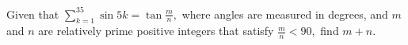 Given that $\sum_{k=1}^{35}\sin 5k=\tan \frac mn,$ where angles are measured in degrees, and $m$ and $n$ are relatively prime positive integers that satisfy $\frac mn<90,$ find $m+n.$